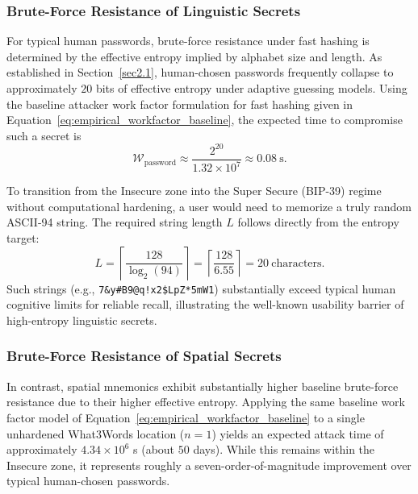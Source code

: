 \documentclass[mathematics,article,accept,pdftex,moreauthors]{Definitions/mdpi}
\begin{document}
\subsubsection{Brute-Force Resistance of Linguistic Secrets}

For typical human passwords, brute-force resistance under fast hashing is determined by the effective entropy implied by alphabet size and length. As established in Section~\ref{sec2.1}, human-chosen passwords frequently collapse to approximately $20$ bits of effective entropy under adaptive guessing models. Using the baseline attacker work factor formulation for fast hashing given in Equation~\eqref{eq:empirical_workfactor_baseline}, the expected time to compromise such a secret is
\begin{equation}
\mathcal{W}_{\text{password}} \approx \frac{2^{20}}{1.32 \times 10^7} \approx 0.08 \ \text{s}.
\end{equation}

To transition from the Insecure zone into the Super Secure (BIP-39) regime without computational hardening, a user would need to memorize a truly random ASCII-94 string. The required string length $L$ follows directly from the entropy target:
\begin{equation}
L = \left\lceil \frac{128}{\log_2(94)} \right\rceil = \left\lceil \frac{128}{6.55} \right\rceil = 20 \ \text{characters}.
\end{equation}
Such strings (e.g., \texttt{7\&y\#B9@q!x2\$LpZ*5mW1}) %
substantially exceed typical human cognitive limits for reliable recall, illustrating the well-known usability barrier of high-entropy linguistic secrets.

\subsubsection{Brute-Force Resistance of Spatial Secrets}

In contrast, spatial mnemonics exhibit substantially higher baseline brute-force resistance due to their higher effective entropy. Applying the same baseline work factor model of Equation~\eqref{eq:empirical_workfactor_baseline} to a single unhardened What3Words location ($n=1$) yields an expected attack time of approximately $4.34 \times 10^{6}$ s (about $50$ days). While this remains within the Insecure zone, it represents roughly a seven-order-of-magnitude improvement over typical human-chosen passwords.
\end{document}
